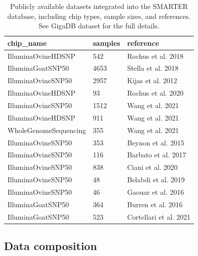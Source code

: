 \documentclass[a4paper,num-refs,gigabyte]{oup-contemporary}
\begin{document}
\begin{table}[b!]
\caption{Publicly available datasets integrated into the SMARTER database, including chip types, sample sizes, and references. See GigaDB dataset for the full details.}
\label{tab:public_datasets}
\begin{center}
\begin{tabular}{l l l}
\toprule
chip\_name & samples & reference \\
\midrule
IlluminaOvineHDSNP & 542 & Rochus et al. 2018 \citep{Rochus2018} \\
IlluminaGoatSNP50 & 4653 & Stella et al. 2018 \citep{Stella2018} \\
IlluminaOvineSNP50 & 2957 & Kijas et al. 2012 \citep{Kijas2012} \\
IlluminaOvineHDSNP & 93 & Rochus et al. 2020 \citep{Rochus2020} \\
IlluminaOvineSNP50 & 1512 & Wang et al. 2021 \citep{Wang2021} \\
IlluminaOvineHDSNP & 911 & Wang et al. 2021 \citep{Wang2021} \\
WholeGenomeSequencing & 355	& Wang et al. 2021 \citep{Wang2021} \\
IlluminaOvineSNP50 & 353 & Beynon et al. 2015 \citep{Beynon2015} \\
IlluminaOvineSNP50 & 116 & Barbato et al. 2017 \citep{Barbato2017} \\
IlluminaOvineSNP50 & 838 & Ciani et al. 2020 \citep{Ciani2020} \\
IlluminaOvineSNP50 & 48 & Belabdi et al. 2019 \citep{Belabdi2019} \\
IlluminaOvineSNP50 & 46 & Gaouar et al. 2016 \citep{Gaouar2016} \\
IlluminaGoatSNP50 & 364 & Burren et al. 2016 \citep{Burren2016} \\
IlluminaGoatSNP50 & 523 & Cortellari et al. 2021 \citep{Cortellari2021} \\
\bottomrule
\end{tabular}
\end{center}
\end{table}

\subsection{Data composition}
\end{document}
